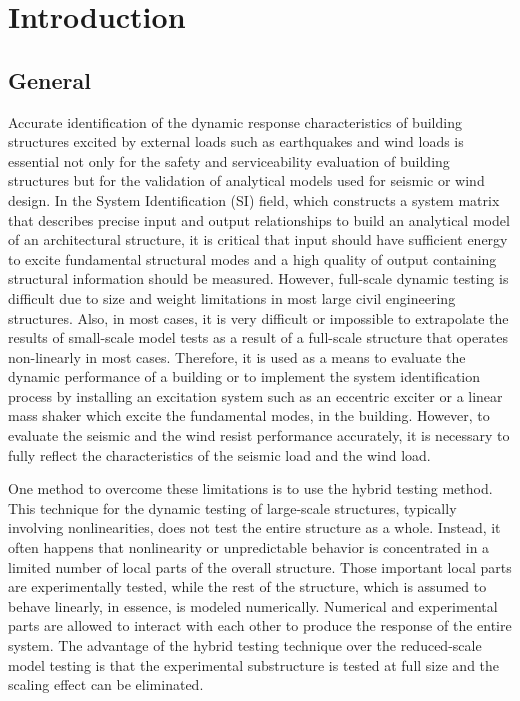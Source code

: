 \chapter{Introduction}
\label{chap:intro}
\section{General}
Accurate identification of the dynamic response characteristics of building structures excited by external loads such as earthquakes and wind loads is essential not only for the safety and serviceability evaluation of building structures but for the validation of analytical models used for seismic or wind design\citep{ljung1987system}. In the System Identification (SI) field, which constructs a system matrix that describes precise input and output relationships to build an analytical model of an architectural structure, it is critical that input should have sufficient energy to excite fundamental structural modes and a high quality of output containing structural information should be measured\citep{alvin1994second,madenci1994free}. However, full-scale dynamic testing is difficult due to size and weight limitations in most large civil engineering structures. Also, in most cases, it is very difficult or impossible to extrapolate the results of small-scale model tests as a result of a full-scale structure that operates non-linearly in most cases. Therefore, it is used as a means to evaluate the dynamic performance of a building or to implement the system identification process by installing an excitation system such as an eccentric exciter or a linear mass shaker which excite the fundamental modes, in the building. However, to evaluate the seismic and the wind resist performance accurately, it is necessary to fully reflect the characteristics of the seismic load and the wind load.

One method to overcome these limitations is to use the hybrid testing method. This technique for the dynamic testing of large-scale structures, typically involving nonlinearities, does not test the entire structure as a whole. Instead, it often happens that nonlinearity or unpredictable behavior is concentrated in a limited number of local parts of the overall structure. Those important local parts are experimentally tested, while the rest of the structure, which is assumed to behave linearly, in essence, is modeled numerically. Numerical and experimental parts are allowed to interact with each other to produce the response of the entire system. The advantage of the hybrid testing technique over the reduced-scale model testing is that the experimental substructure is tested at full size and the scaling effect can be eliminated. 

